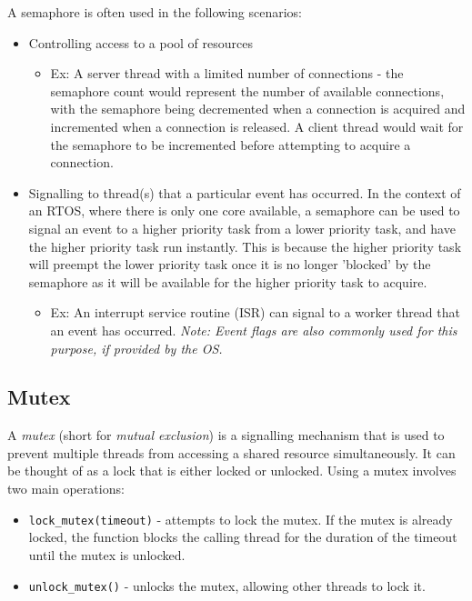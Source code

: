 \documentclass[main.tex]{subfiles}
\begin{document}
\noindent A semaphore is often used in the following scenarios:
\begin{itemize}
    \item Controlling access to a pool of resources 
    \begin{itemize}
        \item Ex: A server thread with a limited number of connections - the semaphore count would represent the number of available connections, with the semaphore being decremented when a connection is acquired and incremented when a connection is released. A client thread would wait for the semaphore to be incremented before attempting to acquire a connection.
    \end{itemize}
    \item Signalling to thread(s) that a particular event has occurred. In the context of an RTOS, where there is only one core available, a semaphore can be used to signal an event to a higher priority task from a lower priority task, and have the higher priority task run instantly. This is because the higher priority task will preempt the lower priority task once it is no longer 'blocked' by the semaphore as it will be available for the higher priority task to acquire.
    \begin {itemize}
        \item Ex: An interrupt service routine (ISR) can signal to a worker thread that an event has occurred. \textit{Note: Event flags are also commonly used for this purpose, if provided by the OS.}
    \end{itemize}
\end{itemize}

\subsection{Mutex}
A \textit{mutex} (short for \textit{mutual exclusion}) is a signalling mechanism that is used to prevent multiple threads from accessing a shared resource simultaneously. It can be thought of as a lock that is either locked or unlocked.
\newline
\newline
\noindent Using a mutex involves two main operations: \begin{itemize}
    \item \texttt{lock\_mutex(timeout)} - attempts to lock the mutex. If the mutex is already locked, the function blocks the calling thread for the duration of the timeout until the mutex is unlocked.
    \item \texttt{unlock\_mutex()} - unlocks the mutex, allowing other threads to lock it.
\end{itemize}
\end{document}
